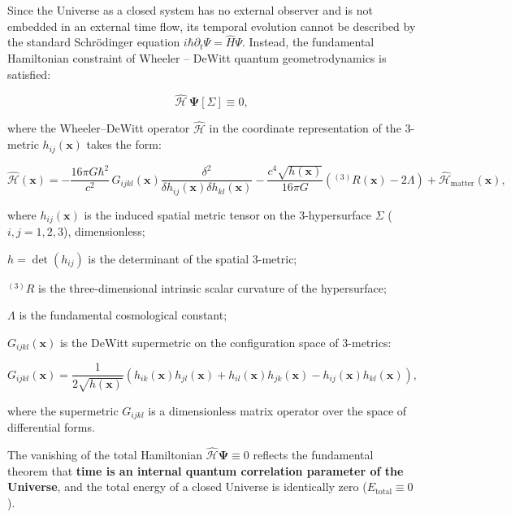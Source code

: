 Since the Universe as a closed system has no external observer and is not embedded in an external time flow, its temporal evolution cannot be described by the standard Schr\"odinger equation $i\hbar \partial_t \Psi = \hat{H}\Psi$. Instead, the fundamental Hamiltonian constraint of Wheeler \cite{ref5} -- DeWitt \cite{ref6} quantum geometrodynamics is satisfied:

\begin{equation}\label{eq:1.30}\tag{1.30}
\hat{\mathcal{H}} \, \mathbf{\Psi}[\Sigma] \equiv 0,
\end{equation}

where the Wheeler--DeWitt operator $\hat{\mathcal{H}}$ in the coordinate representation of the 3-metric $h_{ij}(\mathbf{x})$ takes the form:

\begin{equation}\label{eq:1.31}\tag{1.31}
\hat{\mathcal{H}}(\mathbf{x}) = -\frac{16\pi G \hbar^2}{c^2} \, G_{ijkl}(\mathbf{x}) \frac{\delta^2}{\delta h_{ij}(\mathbf{x}) \delta h_{kl}(\mathbf{x})} - \frac{c^4 \sqrt{h(\mathbf{x})}}{16\pi G} \left( {}^{(3)}R(\mathbf{x}) - 2\Lambda \right) + \hat{\mathcal{H}}_{\text{matter}}(\mathbf{x}),
\end{equation}

where $h_{ij}(\mathbf{x})$ is the induced spatial metric tensor on the 3-hypersurface $\Sigma$ ($i, j = 1, 2, 3$), dimensionless;  

$h = \det(h_{ij})$ is the determinant of the spatial 3-metric;  

${}^{(3)}R$ is the three-dimensional intrinsic scalar curvature of the hypersurface;  

$\Lambda$ is the fundamental cosmological constant;  

$G_{ijkl}(\mathbf{x})$ is the DeWitt supermetric on the configuration space of 3-metrics:

\begin{equation}\label{eq:1.32}\tag{1.32}
G_{ijkl}(\mathbf{x}) = \frac{1}{2\sqrt{h(\mathbf{x})}} \left( h_{ik}(\mathbf{x}) h_{jl}(\mathbf{x}) + h_{il}(\mathbf{x}) h_{jk}(\mathbf{x}) - h_{ij}(\mathbf{x}) h_{kl}(\mathbf{x}) \right),
\end{equation}

where the supermetric $G_{ijkl}$ is a dimensionless matrix operator over the space of differential forms.

The vanishing of the total Hamiltonian $\hat{\mathcal{H}}\mathbf{\Psi} \equiv 0$ reflects the fundamental theorem that \textbf{time is an internal quantum correlation parameter of the Universe}, and the total energy of a closed Universe is identically zero ($E_{\text{total}} \equiv 0$).


